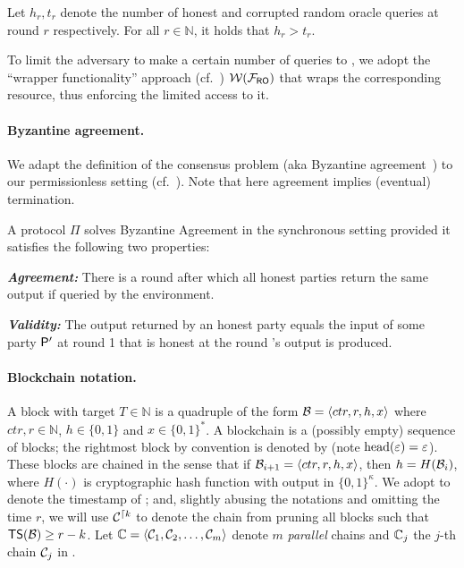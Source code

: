 \begin{definition*}
    Let $h_r, t_r$ denote the number of honest and corrupted random oracle queries at round $r$ respectively.
    For all $r \in \mathbb{N}$, it holds that $h_r > t_r$.
\end{definition*}

To limit the adversary to make a certain number of queries to \funcRO, we adopt the ``wrapper functionality'' approach (cf.~\cite{JC:GMPY11,C:BMTZ17,EC:GKOPZ20}) $\mathcal{W}(\mathcal{F}_{\textsf{RO}})$ that wraps the corresponding resource, thus enforcing the limited access to it.

\paragraph{Byzantine agreement.}
%
We adapt the definition of the consensus problem (aka Byzantine agreement~\cite{TOPLAS:LamShoPea82}) to our permissionless setting (cf.~\cite{EC:GarKiaLeo15}).
%
Note that here agreement implies (eventual) termination.
%
\begin{definition*}
    A protocol $\Pi$ solves Byzantine Agreement in the synchronous setting provided it satisfies the following two properties:
    \begin{cccItemize}[nosep]
        \item \textbf{\emph{Agreement:}} There is a round after which all honest parties return the same output if queried by the environment.
        
        \item \textbf{\emph{Validity:}} The output returned by an honest party \party equals the input of some party $\mathsf{P}'$ at round 1 that is honest at the round \party's output is produced.
    \end{cccItemize}
\end{definition*}

\paragraph{Blockchain notation.}
%
A block with target $T \in \mathbb{N}$ is a quadruple of the form $\mathcal{B} = \langle ctr, r, h, x \rangle$ where $ctr, r \in \mathbb{N}$, $h \in \{0, 1\}$ and $x \in \{0, 1\}^*$.
%
A blockchain \chain is a (possibly empty) sequence of blocks; the rightmost block by convention is denoted by \chainHead{\chain} (note $\mathrm{head}(\varepsilon) = \varepsilon$).
%
These blocks are chained in the sense that if $\mathcal{B}_{i + 1} = \langle ctr, r, h, x \rangle$, then $h = H(\mathcal{B}_i)$, where $H(\cdot)$ is cryptographic hash function with output in $\{0, 1\}^\kappa$.
%
We adopt \timestamp{\block} to denote the timestamp of \block; and, slightly abusing the notations and omitting the time $r$, we will use $\mathcal{C}^{\lceil{k}}$ to denote the chain from pruning all blocks \block such that $\mathsf{TS}(\mathcal{B}) \ge r - k$.
%
Let $\mathbb{C} = \langle \mathcal{C}_1, \mathcal{C}_2, \ldots, \mathcal{C}_m \rangle$ denote $m$ \emph{parallel} chains and $\mathbb{C}_j$ the $j$-th chain $\mathcal{C}_j$ in \parallelChains.

